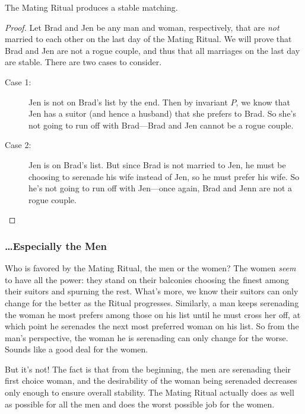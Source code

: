 \begin{theorem}
The Mating Ritual produces a stable matching.
\end{theorem}

\begin{proof}
Let Brad and Jen be any man and woman, respectively, that are
\emph{not} married to each other on the last day of the Mating Ritual.
We will prove that Brad and Jen are not a rogue couple, and thus that
all marriages on the last day are stable.  There are two cases to consider.
\begin{description}

\item[Case 1:] Jen is not on Brad's list by the end.  Then by invariant
  $P$, we know that Jen has a suitor (and hence a husband) that she
  prefers to Brad.  So she's not going to run off with Brad---Brad and
  Jen cannot be a rogue couple.

\item[Case 2:] Jen is on Brad's list.  But since Brad is not married to
  Jen, he must be choosing to serenade his wife instead of Jen, so he
  must prefer his wife.  So he's not going to run off with Jen---once
  again, Brad and Jenn are not a rogue couple.
 \qedhere

\end{description}

\end{proof}


\subsubsection{\dots Especially the Men}

Who is favored by the Mating Ritual, the men or the women?  The women
\emph{seem} to have all the power: they stand on their balconies
choosing the finest among their suitors and spurning the rest.  What's
more, we know their suitors can only change for the better as the
Ritual progresses.  Similarly, a man keeps serenading the woman he
most prefers among those on his list until he must cross her off, at
which point he serenades the next most preferred woman on his list.  So
from the man's perspective, the woman he is serenading can only change
for the worse.  Sounds like a good deal for the women.

But it's not!  The fact is that from the beginning, the men are
serenading their first choice woman, and the desirability of the woman
being serenaded decreases only enough to ensure overall stability.
The Mating Ritual actually does as well as possible for all the men
and does the worst possible job for the women.

